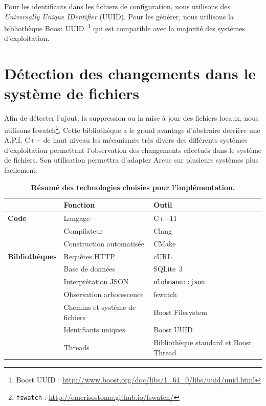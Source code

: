 Pour les identifiants dans les fichiers de configuration, nous utilisons des \emph{Universally Unique IDentifier} (UUID). Pour les générer, nous utilisons la bibliothèque Boost UUID~\footnote{Boost UUID : \url{http://www.boost.org/doc/libs/1_64_0/libs/uuid/uuid.html}} qui est compatible avec la majorité des systèmes d'exploitation.

\section{Détection des changements dans le système de fichiers}

Afin de détecter l'ajout, la suppression ou la mise à jour des fichiers locaux, nous utilisons fswatch\footnote{\texttt{fswatch} : \url{http://emcrisostomo.github.io/fswatch/}}. Cette bibliothèque a le grand avantage d'abstraire derrière une A.P.I. C++ de haut niveau les mécanismes très divers des différents systèmes d'exploitation permettant l'observation des changements effectués dans le système de fichiers. Son utilisation permettra d'adapter Arcus sur plusieurs systèmes plus facilement.

\begin{table}[h]
    \centering
    \begin{tabular}{lll}
        & \textbf{Fonction} & \textbf{Outil}\\
        \toprule
        \textbf{Code} & Langage & C++11\\
        \cmidrule{2-3}
        & Compilateur & Clang\\
        \cmidrule{2-3}
        & Construction automatisée & CMake\\
        \midrule
        \textbf{Bibliothèques} & Requêtes HTTP & cURL\\
        \cmidrule{2-3}
        & Base de données & SQLite~3\\
        \cmidrule{2-3}
        & Interprétation JSON & \texttt{nlohmann::json}\\
        \cmidrule{2-3}
        & Observation arborescence & fswatch\\
        \cmidrule{2-3}
        & Chemins et système de fichiers & Boost Filesystem\\
        \cmidrule{2-3}
        & Identifiants uniques & Boost UUID\\
        \cmidrule{2-3}
        & Threads & Bibliothèque standard et Boost Thread\\
        \bottomrule
    \end{tabular}

    \caption{\textbf{Résumé des technologies choisies pour l'implémentation.}}
    \label{table:implementation-tools}
\end{table}
